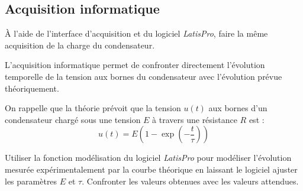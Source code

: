 \documentclass{tp}
\begin{document}
\subsection{Acquisition informatique} 
\`A l'aide de l'interface d'acquisition et du logiciel \emph{LatisPro}, faire la même acquisition de la charge du condensateur.

L'acquisition informatique permet de confronter directement l'évolution temporelle de la tension aux bornes du condensateur avec l'évolution prévue théoriquement. 

On rappelle que la théorie prévoit que la tension $u(t)$ aux bornes d'un condensateur chargé sous une tension $E$ à travers une résistance $R$ est :
\begin{equation}
	u(t)=E\left(1-\exp\left(-\frac t\tau\right)\right)
\end{equation}

Utiliser la fonction modélisation du logiciel \emph{LatisPro} pour modéliser l'évolution mesurée expérimentalement par la courbe théorique en laissant le logiciel ajuster les paramètres $E$ et $\tau$. Confronter les valeurs obtenues avec les valeurs attendues.
\end{document}
